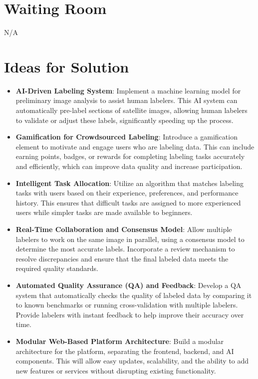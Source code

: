 \documentclass[12pt]{article}
\begin{document}
\section{Waiting Room}
N/A

\section{Ideas for Solution}

\begin{itemize} 
    \item \textbf{AI-Driven Labeling System}: Implement a machine learning model for preliminary image analysis to assist human labelers. This AI system can automatically pre-label sections of satellite images, allowing human labelers to validate or adjust these labels, significantly speeding up the process.
    
    \item \textbf{Gamification for Crowdsourced Labeling}: Introduce a gamification element to motivate and engage users who are labeling data. This can include earning points, badges, or rewards for completing labeling tasks accurately and efficiently, which can improve data quality and increase participation.
    
    \item \textbf{Intelligent Task Allocation}: Utilize an algorithm that matches labeling tasks with users based on their experience, preferences, and performance history. This ensures that difficult tasks are assigned to more experienced users while simpler tasks are made available to beginners.
    
    \item \textbf{Real-Time Collaboration and Consensus Model}: Allow multiple labelers to work on the same image in parallel, using a consensus model to determine the most accurate labels. Incorporate a review mechanism to resolve discrepancies and ensure that the final labeled data meets the required quality standards.
    
    \item \textbf{Automated Quality Assurance (QA) and Feedback}: Develop a QA system that automatically checks the quality of labeled data by comparing it to known benchmarks or running cross-validation with multiple labelers. Provide labelers with instant feedback to help improve their accuracy over time.
    
    \item \textbf{Modular Web-Based Platform Architecture}: Build a modular architecture for the platform, separating the frontend, backend, and AI components. This will allow easy updates, scalability, and the ability to add new features or services without disrupting existing functionality.
    

\end{itemize}
\end{document}
